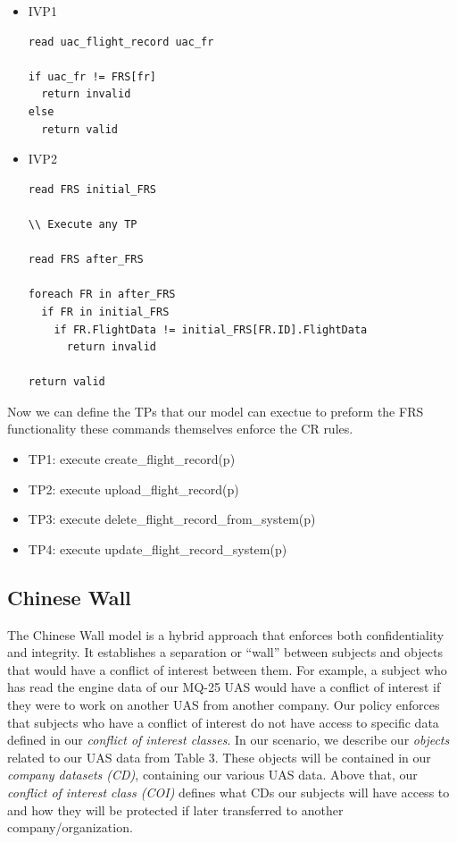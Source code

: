 \documentclass[10pt,journal,compsoc]{IEEEtran}
\begin{document}
\begin{itemize}
  \item IVP1
\begin{lstlisting}
read uac_flight_record uac_fr

if uac_fr != FRS[fr]
  return invalid
else
  return valid
\end{lstlisting}

  \item IVP2
\begin{lstlisting}
read FRS initial_FRS

\\ Execute any TP 

read FRS after_FRS

foreach FR in after_FRS
  if FR in initial_FRS
    if FR.FlightData != initial_FRS[FR.ID].FlightData
      return invalid

return valid
\end{lstlisting}
\end{itemize}

Now we can define the TPs that our model can exectue to preform the FRS functionality these commands themselves enforce the CR rules.

\begin{itemize}
  \item TP1: execute create\_flight\_record(p)
  \item TP2: execute upload\_flight\_record(p)
  \item TP3: execute delete\_flight\_record\_from\_system(p)
  \item TP4: execute update\_flight\_record\_system(p)
\end{itemize}

\subsection{Chinese Wall}

The Chinese Wall model is a hybrid approach that enforces both confidentiality and integrity. It establishes a separation or ``wall'' between subjects and objects that would have a conflict of interest between them. For example, a subject who has read the engine data of our MQ-25 UAS would have a conflict of interest if they were to work on another UAS from another company. Our policy enforces that subjects who have a conflict of interest do not have access to specific data defined in our \textit{conflict of interest classes}. In our scenario, we describe our \textit{objects} related to our UAS data from Table 3. These objects will be contained in our \textit{company datasets (CD)}, containing our various UAS data. Above that, our \textit{conflict of interest class (COI)} defines what CDs our subjects will have access to and how they will be protected if later transferred to another company/organization. 
\end{document}
